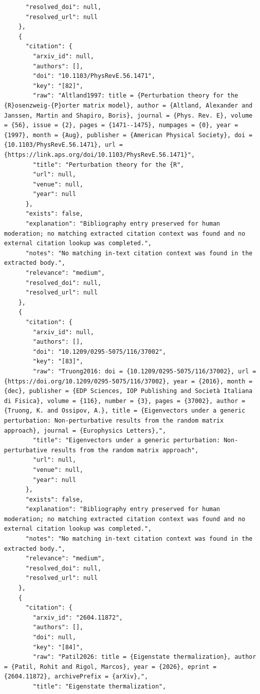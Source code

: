 \documentclass[11pt]{article}
\begin{document}
\begin{verbatim}
      "resolved_doi": null,
      "resolved_url": null
    },
    {
      "citation": {
        "arxiv_id": null,
        "authors": [],
        "doi": "10.1103/PhysRevE.56.1471",
        "key": "[82]",
        "raw": "Altland1997: title = {Perturbation theory for the {R}osenzweig-{P}orter matrix model}, author = {Altland, Alexander and Janssen, Martin and Shapiro, Boris}, journal = {Phys. Rev. E}, volume = {56}, issue = {2}, pages = {1471--1475}, numpages = {0}, year = {1997}, month = {Aug}, publisher = {American Physical Society}, doi = {10.1103/PhysRevE.56.1471}, url = {https://link.aps.org/doi/10.1103/PhysRevE.56.1471}",
        "title": "Perturbation theory for the {R",
        "url": null,
        "venue": null,
        "year": null
      },
      "exists": false,
      "explanation": "Bibliography entry preserved for human moderation; no matching extracted citation context was found and no external citation lookup was completed.",
      "notes": "No matching in-text citation context was found in the extracted body.",
      "relevance": "medium",
      "resolved_doi": null,
      "resolved_url": null
    },
    {
      "citation": {
        "arxiv_id": null,
        "authors": [],
        "doi": "10.1209/0295-5075/116/37002",
        "key": "[83]",
        "raw": "Truong2016: doi = {10.1209/0295-5075/116/37002}, url = {https://doi.org/10.1209/0295-5075/116/37002}, year = {2016}, month = {dec}, publisher = {EDP Sciences, IOP Publishing and Società Italiana di Fisica}, volume = {116}, number = {3}, pages = {37002}, author = {Truong, K. and Ossipov, A.}, title = {Eigenvectors under a generic perturbation: Non-perturbative results from the random matrix approach}, journal = {Europhysics Letters},",
        "title": "Eigenvectors under a generic perturbation: Non-perturbative results from the random matrix approach",
        "url": null,
        "venue": null,
        "year": null
      },
      "exists": false,
      "explanation": "Bibliography entry preserved for human moderation; no matching extracted citation context was found and no external citation lookup was completed.",
      "notes": "No matching in-text citation context was found in the extracted body.",
      "relevance": "medium",
      "resolved_doi": null,
      "resolved_url": null
    },
    {
      "citation": {
        "arxiv_id": "2604.11872",
        "authors": [],
        "doi": null,
        "key": "[84]",
        "raw": "Patil2026: title = {Eigenstate thermalization}, author = {Patil, Rohit and Rigol, Marcos}, year = {2026}, eprint = {2604.11872}, archivePrefix = {arXiv},",
        "title": "Eigenstate thermalization",

\end{verbatim}
\end{document}
